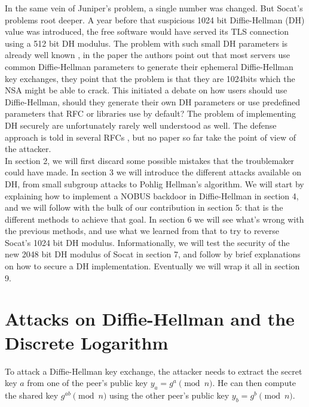 \documentclass[a4paper,11pt,twocolumn]{article}
\begin{document}
In the same vein of Juniper's problem, a single number was changed. But Socat's problems root deeper. A year before that suspicious 1024 bit Diffie-Hellman (DH) value was introduced, the free software would have served its TLS connection using a 512 bit DH modulus. The problem with such small DH parameters is already well known \cite{logjam}, in the paper the authors point out that most servers use common Diffie-Hellman parameters to generate their ephemeral Diffie-Hellman key exchanges, they point that the problem is that they are 1024bits which the NSA might be able to crack. This initiated a debate on how users should use Diffie-Hellman, should they generate their own DH parameters or use predefined parameters that RFC  or libraries use by default? The problem of implementing DH securely are unfortunately rarely well understood as well. The defense approach is told in several RFCs \cite{rfc2631} \cite{rfc2785}, but no paper so far take the point of view of the attacker.\\

In section 2, we will first discard some possible mistakes that the troublemaker could have made. In section 3 we will introduce the different attacks available on DH, from small subgroup attacks to Pohlig Hellman's algorithm. We will start by explaining how to implement a NOBUS backdoor in Diffie-Hellman in section 4, and we will follow with the bulk of our contribution in section 5: that is the different methods to achieve that goal. In section 6 we will see what's wrong with the previous methods, and use what we learned from that to try to reverse Socat's 1024 bit DH modulus. Informationally, we will test the security of the new 2048 bit DH modulus of Socat in section 7, and follow by brief explanations on how to secure a DH implementation. Eventually we will wrap it all in section 9.

\section{Attacks on Diffie-Hellman and the Discrete Logarithm}

To attack a Diffie-Hellman key exchange, the attacker needs to extract the secret key $a$ from one of the peer's public key $y_a = g^a \pmod{n}$. He can then compute the shared key $g^{ab} \pmod{n}$ using the other peer's public key $y_b = g^b \pmod{n}$.\\
\end{document}
